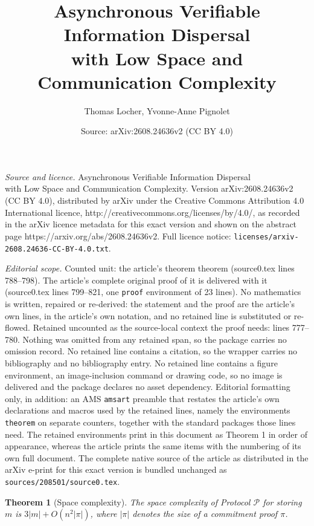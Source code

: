 \documentclass[10pt,a4paper]{amsart}
\title{Asynchronous Verifiable Information Dispersal\texorpdfstring{\\}{}with Low Space and Communication Complexity}
\author{Thomas Locher, Yvonne-Anne Pignolet}
\date{Source: arXiv:2608.24636v2 (CC BY 4.0)}
\newtheorem{theorem}{Theorem}
\begin{document}
\maketitle

\noindent\emph{Source and licence.} Asynchronous Verifiable Information Dispersal\texorpdfstring{\\}{}with Low Space and Communication Complexity. Version arXiv:2608.24636v2 (CC BY 4.0), distributed by arXiv under the Creative Commons Attribution 4.0 International licence, http://creativecommons.org/licenses/by/4.0/, as recorded in the arXiv licence metadata for this exact version and shown on the abstract page https://arxiv.org/abs/2608.24636v2. Full licence notice: \texttt{licenses/arxiv-2608.24636-CC-BY-4.0.txt}.\par\smallskip

\noindent\textit{Editorial scope.} Counted unit: the article's theorem theorem (source0.tex lines 788--798). The article's complete original proof of it is delivered with it (source0.tex lines 799--821, one \texttt{proof} environment of 23 lines). No mathematics is written, repaired or re-derived: the statement and the proof are the article's own lines, in the article's own notation, and no retained line is substituted or re-flowed.  Retained uncounted as the source-local context the proof needs: lines 777--780.  Nothing was omitted from any retained span, so the package carries no omission record.  No retained line contains a citation, so the wrapper carries no bibliography and no bibliography entry.  No retained line contains a figure environment, an image-inclusion command or drawing code, so no image is delivered and the package declares no asset dependency.  Editorial formatting only, in addition: an AMS \texttt{amsart} preamble that restates the article's own declarations and macros used by the retained lines, namely the environments \texttt{theorem} on separate counters, together with the standard packages those lines need.  The retained environments print in this document as Theorem 1 in order of appearance, whereas the article prints the same items with the numbering of its own full document.  The complete native source of the article as distributed in the arXiv e-print for this exact version is bundled unchanged as \texttt{sources/208501/source0.tex}.
\begin{theorem}[Space complexity]
\label{theorem:space_complexity}
The space complexity of Protocol $\mathcal{P}$ for storing $m$ is $3|m| + O(n^2|\pi|)$, where $|\pi|$ denotes the size of a commitment proof $\pi$.
\end{theorem}
\end{document}
